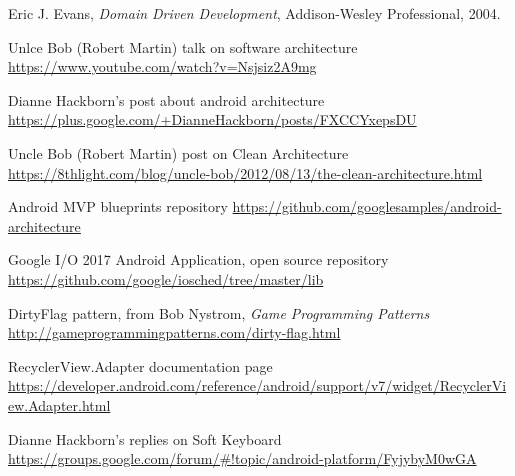 
%
%
%
\begin{thebibliography}{1}
	
	Eric J. Evans,  \emph{Domain Driven Development},
	\relax Addison-Wesley Professional, 2004.
	
	Unlce Bob (Robert Martin) talk on software architecture
	\url{https://www.youtube.com/watch?v=Nsjsiz2A9mg}
	
	Dianne Hackborn's post about android architecture
	\url{https://plus.google.com/+DianneHackborn/posts/FXCCYxepsDU}
	
	Uncle Bob (Robert Martin) post on Clean Architecture
	\url{https://8thlight.com/blog/uncle-bob/2012/08/13/the-clean-architecture.html}
	
	Android MVP blueprints repository \url{https://github.com/googlesamples/android-architecture}
	
	Google I/O 2017 Android Application, open source repository \url{https://github.com/google/iosched/tree/master/lib}
	
	DirtyFlag pattern, from Bob Nystrom, \emph{Game Programming Patterns}
	\url{http://gameprogrammingpatterns.com/dirty-flag.html}
	
	RecyclerView.Adapter documentation page \url{https://developer.android.com/reference/android/support/v7/widget/RecyclerView.Adapter.html}
	
	Dianne Hackborn's replies on Soft Keyboard
	\url{https://groups.google.com/forum/#!topic/android-platform/FyjybyM0wGA}
	

	
	
	
	
\end{thebibliography}